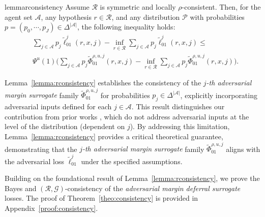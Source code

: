 \begin{restatable}{lemma}{rconsistency}\label{lemma:rconsistency} 
Assume \( \mathcal{R} \) is symmetric and locally \( \rho \)-consistent. Then, for the agent set \( \mathcal{A} \), any hypothesis \( r \in \mathcal{R} \), and any distribution \( \mathcal{P} \) with probabilities \( p = (p_0, \cdots, p_J) \in \Delta^{|\mathcal{A}|} \), the following inequality holds:
\begin{equation*}
\begin{aligned}
    & \sum_{j \in \mathcal{A}} p_j \widetilde{\ell}_{01}^j(r,x,j) - \inf_{r \in \mathcal{R}} \sum_{j \in \mathcal{A}} p_j \widetilde{\ell}_{01}^j(r,x,j) \leq \\
    & \Psi^u(1) \Big( \sum_{j \in \mathcal{A}} p_j \widetilde{\Phi}^{\rho,u,j}_{01}(r,x, j) - \inf_{r \in \mathcal{R}} \sum_{j \in \mathcal{A}} p_j \widetilde{\Phi}^{\rho,u,j}_{01}(r,x, j) \Big).
\end{aligned}
\end{equation*}
\end{restatable}
Lemma~\ref{lemma:rconsistency} establishes the consistency of the \emph{\(j\)-th adversarial margin surrogate} family \( \widetilde{\Phi}^{\rho,u,j}_{01} \) for probabilities \( p_j \in \Delta^{|\mathcal{A}|} \), explicitly incorporating adversarial inputs defined for each \( j \in \mathcal{A} \). This result distinguishes our contribution from prior works \citep{mao2023crossentropylossfunctionstheoretical, Grounded, Awasthi_Mao_Mohri_Zhong_2022_multi}, which do not address adversarial inputs at the level of the distribution (dependent on \(j\)). By addressing this limitation, Lemma~\ref{lemma:rconsistency} provides a critical theoretical guarantee, demonstrating that the \emph{\(j\)-th adversarial margin surrogate} family \( \widetilde{\Phi}^{\rho,u,j}_{01} \) aligns with the adversarial loss \( \widetilde{\ell}_{01}^j \) under the specified assumptions.


Building on the foundational result of Lemma~\ref{lemma:rconsistency}, we prove the Bayes and \((\mathcal{R}, \mathcal{G})\)-consistency of the \textit{adversarial margin deferral surrogate} losses. The proof of Theorem~\ref{theo:consistency} is provided in Appendix~\ref{proof:consistency}.


